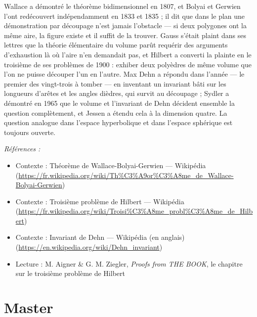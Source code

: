 \documentclass[11pt]{article}
\newenvironment{refs}{\par\small\noindent\emph{Références :}\begin{itemize}\setlength\itemsep{0pt}}{\end{itemize}\normalsize}
\begin{document}
\noindent Wallace a démontré le théorème bidimensionnel en 1807, et Bolyai et
Gerwien l'ont redécouvert indépendamment en 1833 et 1835 ; il dit que dans le plan une
démonstration par découpage n'est jamais l'obstacle --- si deux polygones ont la même aire, la
figure existe et il suffit de la trouver. Gauss s'était plaint dans ses lettres que la théorie
élémentaire du volume parût requérir des arguments d'exhaustion là où l'aire n'en demandait
pas, et Hilbert a converti la plainte en le troisième de ses problèmes de 1900 : exhiber deux
polyèdres de même volume que l'on ne puisse découper l'un en l'autre. Max Dehn a répondu dans
l'année --- le premier des vingt-trois à tomber --- en inventant un invariant bâti sur les
longueurs d'arêtes et les angles dièdres, qui survit au découpage ; Sydler a démontré en 1965
que le volume et l'invariant de Dehn décident ensemble la question complètement, et Jessen a
étendu cela à la dimension quatre. La question analogue dans l'espace hyperbolique et dans
l'espace sphérique est toujours ouverte.

\begin{refs}
\item Contexte : Théorème de Wallace-Bolyai-Gerwien --- Wikipédia (\url{https://fr.wikipedia.org/wiki/Th%C3%A9or%C3%A8me_de_Wallace-Bolyai-Gerwien})
\item Contexte : Troisième problème de Hilbert --- Wikipédia (\url{https://fr.wikipedia.org/wiki/Troisi%C3%A8me_probl%C3%A8me_de_Hilbert})
\item Contexte : Invariant de Dehn --- Wikipédia (en anglais) (\url{https://en.wikipedia.org/wiki/Dehn_invariant})
\item Lecture : M. Aigner \& G. M. Ziegler, \textit{Proofs from THE BOOK}, le chapitre sur le troisième problème de Hilbert
\end{refs}

\bigskip


\section*{Master}
\end{document}
